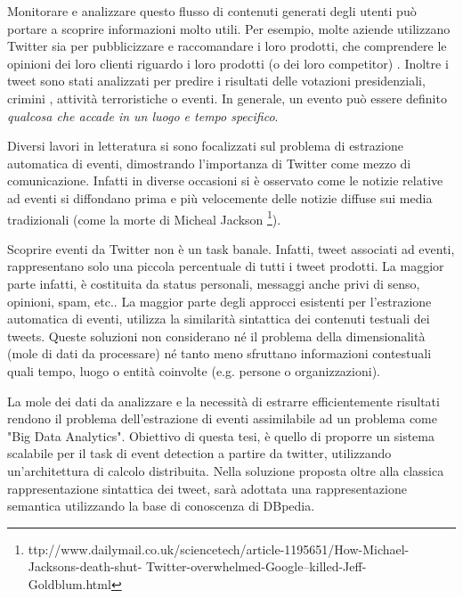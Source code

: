 Monitorare e analizzare questo flusso di  contenuti generati degli utenti può portare a scoprire informazioni molto utili. Per esempio, molte aziende utilizzano Twitter sia per pubblicizzare e raccomandare i loro prodotti, che comprendere  le opinioni dei loro clienti riguardo i loro prodotti (o dei loro competitor) .
Inoltre i tweet sono stati analizzati per predire i risultati delle votazioni presidenziali, crimini \cite{Wang2012}, attività terroristiche o eventi. In generale, un evento può essere definito \emph{qualcosa che accade in un luogo e tempo specifico}. 

Diversi lavori in letteratura si sono focalizzati sul problema di estrazione automatica di eventi, dimostrando l'importanza di Twitter come mezzo di comunicazione. Infatti in diverse occasioni si è osservato come le notizie relative ad eventi si diffondano prima e più velocemente delle notizie diffuse sui media tradizionali (come la morte di Micheal Jackson \footnote{ttp://www.dailymail.co.uk/sciencetech/article-1195651/How-Michael-Jacksons-death-shut- Twitter-overwhelmed-Google–killed-Jeff-Goldblum.html}).

Scoprire eventi da Twitter non è un task banale. Infatti, tweet associati ad  eventi, rappresentano solo una piccola percentuale di tutti i tweet prodotti. La maggior parte infatti, è costituita da status personali, messaggi anche privi di senso, opinioni, spam, etc..   
La maggior parte degli approcci esistenti per l'estrazione automatica di eventi, utilizza la similarità sintattica dei contenuti testuali dei tweets. Queste soluzioni non considerano né il problema della dimensionalità (mole di dati da processare) né tanto meno sfruttano informazioni contestuali quali tempo, luogo o entità coinvolte (e.g. persone o organizzazioni).

La mole dei dati da analizzare e la necessità di estrarre efficientemente risultati rendono il problema dell'estrazione di eventi assimilabile ad un problema  come  "Big Data Analytics".  
Obiettivo di questa tesi, è quello di proporre un sistema scalabile per il task di event detection a partire da twitter, utilizzando un'architettura di calcolo distribuita. Nella soluzione proposta oltre alla classica rappresentazione sintattica dei tweet, sarà adottata una rappresentazione semantica utilizzando la base di conoscenza di DBpedia.


